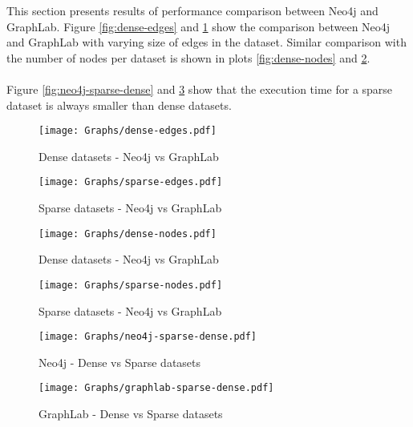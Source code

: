 This section presents results of performance comparison between Neo4j and GraphLab. Figure \ref{fig:dense-edges} and \ref{fig:sparse-edges} show the comparison between Neo4j and GraphLab with varying size of edges in the dataset. Similar comparison with the number of nodes per dataset is shown in plots \ref{fig:dense-nodes} and \ref{fig:sparse-nodes}. \\
\\
Figure \ref{fig:neo4j-sparse-dense} and \ref{fig:graphlab-sparse-dense} show that the execution time for a sparse dataset is always smaller than dense datasets.

	\begin{figure}
		\begin{minipage}{.5\textwidth}
			\centering
			\texttt{[image: Graphs/dense-edges.pdf]}
			\caption{Dense datasets - Neo4j vs GraphLab\label{fig:dense-edges}}
		\end{minipage}
		\begin{minipage}{.5\textwidth}
			\centering
			\texttt{[image: Graphs/sparse-edges.pdf]}
			\caption{Sparse datasets - Neo4j vs GraphLab\label{fig:sparse-edges}}
		\end{minipage}
	\end{figure}
	
	
	\begin{figure}
		\begin{minipage}{.5\textwidth}
			\centering
			\texttt{[image: Graphs/dense-nodes.pdf]}
			\caption{Dense datasets - Neo4j vs GraphLab\label{fig:dense-nodes}}
		\end{minipage}
		\begin{minipage}{.5\textwidth}
			\centering
			\texttt{[image: Graphs/sparse-nodes.pdf]}
			\caption{Sparse datasets - Neo4j vs GraphLab\label{fig:sparse-nodes}}
		\end{minipage}
	\end{figure}
	
	\begin{figure}
		\begin{minipage}{.5\textwidth}
			\centering
			\texttt{[image: Graphs/neo4j-sparse-dense.pdf]}
			\caption{Neo4j - Dense vs Sparse datasets\label{fig:neo4j-sparse-dense}}
		\end{minipage}
		\begin{minipage}{.5\textwidth}
			\centering
			\texttt{[image: Graphs/graphlab-sparse-dense.pdf]}
			\caption{GraphLab - Dense vs Sparse datasets\label{fig:graphlab-sparse-dense}}
		\end{minipage}
	\end{figure}